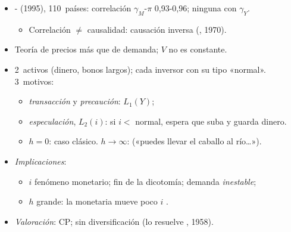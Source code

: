 \documentclass{article}
\begin{document}
\begin{columnas}
\begin{itemize}
\begin{itemize}
  \end{itemize}
\end{itemize}
\begin{itemize}
\item {}- (1995), 110~países: correlación $\gamma_M$-$\pi$ 0,93-0,96; ninguna con $\gamma_Y$.
  \begin{itemize}
  \item Correlación $\neq$ causalidad: causación inversa (, 1970).
  \end{itemize}
\item Teoría de precios más que de demanda; $V$ no es constante.
\end{itemize}
\begin{itemize}
\item 2~activos (dinero, bonos largos); cada inversor con su tipo «normal». 3~motivos:
  \begin{itemize}
  \item \emph{transacción} y \emph{precaución}: $L_1(Y)$;
  \item \emph{especulación}, $L_2(i)$: si $i<$ normal, espera que suba y guarda dinero.
  \end{itemize}
  \begin{itemize}
  \item $h=0$: caso clásico. $h\to\infty$:  («puedes llevar el caballo al río…»).
  \end{itemize}
\end{itemize}
\begin{itemize}
\item \emph{Implicaciones}:
  \begin{itemize}
  \item $i$ fenómeno monetario; fin de la dicotomía; demanda \emph{inestable};
  \item $h$ grande: la monetaria mueve poco $i$ .
  \end{itemize}
\item \emph{Valoración}: CP; sin diversificación (lo resuelve , 1958).
\end{itemize}

\end{columnas}
\end{document}
